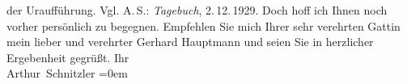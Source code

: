 \begin{ledgroupsized}[t]{13cm}
{{{                  der Uraufführung. Vgl. A. S.: \emph{Tagebuch}, 2. 12. 1929}}}\label{K_L02526-2h}. Doch hoff ich Ihnen noch vorher persönlich zu begegnen.\pend
           \pstart
           Empfehlen Sie mich Ihrer sehr verehrten Gattin mein lieber und verehrter Gerhard
               Hauptmann und seien Sie in herzlicher Ergebenheit gegrüßt.\pend
           \pstart
           Ihr{\\[\baselineskip]}\spacefill\mbox{Arthur Schnitzler}\pend
           \leftskip=0em{}
         
         \endnumbering{}\end{ledgroupsized}  \newcommand{\dateiname}{L02526}\newcommand{\titel}{Arthur Schnitzler an Gerhart Hauptmann, 27. 11. 1929}\newcommand{\editorInnen}{ Martin Anton Müller und Gerd-Hermann Susen}
      
